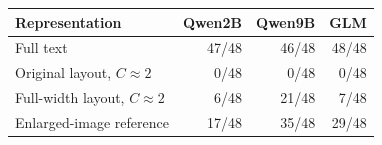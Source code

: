 \begin{tabular}{lrrr}
\toprule
Representation & Qwen2B & Qwen9B & GLM \\
\midrule
Full text & 47/48 & 46/48 & 48/48 \\
Original layout, $C\approx2$ & 0/48 & 0/48 & 0/48 \\
Full-width layout, $C\approx2$ & 6/48 & 21/48 & 7/48 \\
Enlarged-image reference & 17/48 & 35/48 & 29/48 \\
\bottomrule
\end{tabular}
